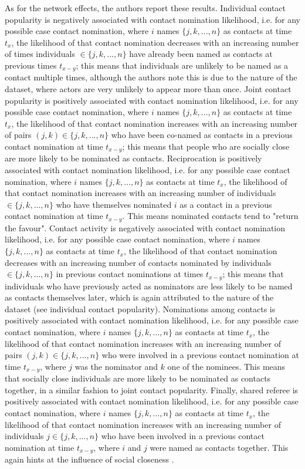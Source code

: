 As for the network effects, the authors report these results. Individual contact popularity is negatively associated with contact nomination likelihood, i.e. for any possible case contact nomination, where $i$ names $\{j,k,...,n\}$ as contacts at time $t_x$, the likelihood of that contact nomination decreases with an increasing number of times individuals $\in \{j,k,...,n\}$ have already been named as contacts at previous times $t_{x-y}$; this means that individuals are unlikely to be named as a contact multiple times, although the authors note this is due to the nature of the dataset, where actors are very unlikely to appear more than once. Joint contact popularity is positively associated with contact nomination likelihood, i.e. for any possible case contact nomination, where $i$ names $\{j,k,...,n\}$ as contacts at time $t_x$, the likelihood of that contact nomination increases with an increasing number of pairs $(j,k) \in \{j,k,...,n\}$ who have been co-named as contacts in a previous contact nomination at time $t_{x-y}$; this means that people who are socially close are more likely to be nominated as contacts. Reciprocation is positively associated with contact nomination likelihood, i.e. for any possible case contact nomination, where $i$ names $\{j,k,...,n\}$ as contacts at time $t_{x}$, the likelihood of that contact nomination increases with an increasing number of individuals $\in \{j,k,...,n\}$ who have themselves nominated $i$ as a contact in a previous contact nomination at time $t_{x-y}$. This means nominated contacts tend to "return the favour". Contact activity is negatively associated with contact nomination likelihood, i.e. for any possible case contact nomination, where $i$ names $\{j,k,...,n\}$ as contacts at time $t_x$, the likelihood of that contact nomination decreases with an increasing number of contacts nominated by individuals $\in \{j,k,...,n\}$ in previous contact nominations at times $t_{x-y}$; this means that individuals who have previously acted as nominators are less likely to be named as contacts themselves later, which is again attributed to the nature of the dataset (see individual contact popularity). Nominations among contacts is positively associated with contact nomination likelihood, i.e. for any possible case contact nomination, where $i$ names $\{j,k,...,n\}$ as contacts at time $t_x$, the likelihood of that contact nomination increases with an increasing number of pairs $(j,k) \in \{j,k,...,n\}$ who were involved in a previous contact nomination at time $t_{x-y}$, where $j$ was the nominator and $k$ one of the nominees. This means that socially close individuals are more likely to be nominated as contacts together, in a similar fashion to joint contact popularity. Finally, shared referee is positively associated with contact nomination likelihood, i.e. for any possible case contact nomination, where $i$ names $\{j,k,...,n\}$ as contacts at time $t_x$, the likelihood of that contact nomination increases with an increasing number of individuals $j \in \{j,k,...,n\}$ who have been involved in a previous contact nomination at time $t_{x-y}$, where $i$ and $j$ were named as contacts together. This again hints at the influence of social closeness \cite{hancean2021role}.

